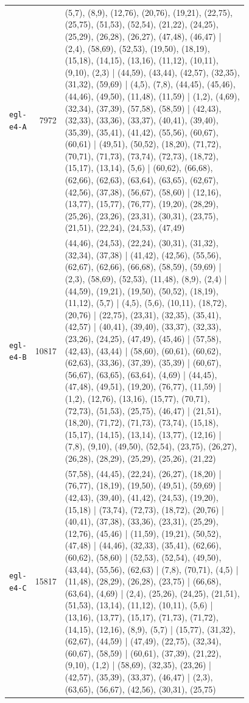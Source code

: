 \begin{landscape}
\begin{longtable}{lr>{\tiny\raggedright\arraybackslash}p{0.78\linewidth}}
\texttt{egl-e4-A} & 7972 & (5,7), (8,9), (12,76), (20,76), (19,21), (22,75), (25,75), (51,53), (52,54), (21,22), (24,25), (25,29), (26,28), (26,27), (47,48), (46,47) | (2,4), (58,69), (52,53), (19,50), (18,19), (15,18), (14,15), (13,16), (11,12), (10,11), (9,10), (2,3) | (44,59), (43,44), (42,57), (32,35), (31,32), (59,69) | (4,5), (7,8), (44,45), (45,46), (44,46), (49,50), (11,48), (11,59) | (1,2), (4,69), (32,34), (37,39), (57,58), (58,59) | (42,43), (32,33), (33,36), (33,37), (40,41), (39,40), (35,39), (35,41), (41,42), (55,56), (60,67), (60,61) | (49,51), (50,52), (18,20), (71,72), (70,71), (71,73), (73,74), (72,73), (18,72), (15,17), (13,14), (5,6) | (60,62), (66,68), (62,66), (62,63), (63,64), (63,65), (62,67), (42,56), (37,38), (56,67), (58,60) | (12,16), (13,77), (15,77), (76,77), (19,20), (28,29), (25,26), (23,26), (23,31), (30,31), (23,75), (21,51), (22,24), (24,53), (47,49) \\[2pt]
\texttt{egl-e4-B} & 10817 & (44,46), (24,53), (22,24), (30,31), (31,32), (32,34), (37,38) | (41,42), (42,56), (55,56), (62,67), (62,66), (66,68), (58,59), (59,69) | (2,3), (58,69), (52,53), (11,48), (8,9), (2,4) | (44,59), (19,21), (19,50), (50,52), (18,19), (11,12), (5,7) | (4,5), (5,6), (10,11), (18,72), (20,76) | (22,75), (23,31), (32,35), (35,41), (42,57) | (40,41), (39,40), (33,37), (32,33), (23,26), (24,25), (47,49), (45,46) | (57,58), (42,43), (43,44) | (58,60), (60,61), (60,62), (62,63), (33,36), (37,39), (35,39) | (60,67), (56,67), (63,65), (63,64), (4,69) | (44,45), (47,48), (49,51), (19,20), (76,77), (11,59) | (1,2), (12,76), (13,16), (15,77), (70,71), (72,73), (51,53), (25,75), (46,47) | (21,51), (18,20), (71,72), (71,73), (73,74), (15,18), (15,17), (14,15), (13,14), (13,77), (12,16) | (7,8), (9,10), (49,50), (52,54), (23,75), (26,27), (26,28), (28,29), (25,29), (25,26), (21,22) \\[2pt]
\texttt{egl-e4-C} & 15817 & (57,58), (44,45), (22,24), (26,27), (18,20) | (76,77), (18,19), (19,50), (49,51), (59,69) | (42,43), (39,40), (41,42), (24,53), (19,20), (15,18) | (73,74), (72,73), (18,72), (20,76) | (40,41), (37,38), (33,36), (23,31), (25,29), (12,76), (45,46) | (11,59), (19,21), (50,52), (47,48) | (44,46), (32,33), (35,41), (62,66), (60,62), (58,60) | (52,53), (52,54), (49,50), (43,44), (55,56), (62,63) | (7,8), (70,71), (4,5) | (11,48), (28,29), (26,28), (23,75) | (66,68), (63,64), (4,69) | (2,4), (25,26), (24,25), (21,51), (51,53), (13,14), (11,12), (10,11), (5,6) | (13,16), (13,77), (15,17), (71,73), (71,72), (14,15), (12,16), (8,9), (5,7) | (15,77), (31,32), (62,67), (44,59) | (47,49), (22,75), (32,34), (60,67), (58,59) | (60,61), (37,39), (21,22), (9,10), (1,2) | (58,69), (32,35), (23,26) | (42,57), (35,39), (33,37), (46,47) | (2,3), (63,65), (56,67), (42,56), (30,31), (25,75) \\[2pt]

\end{longtable}
\end{landscape}
